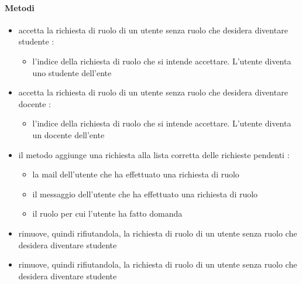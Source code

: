 \paragraph{Metodi}
\begin{itemize}
\item {}
\newline
accetta la richiesta di ruolo di un utente senza ruolo che desidera diventare studente
\newline
{} :
\begin{itemize}
\item {}
\newline
l'indice della richiesta di ruolo che si intende accettare. L'utente diventa uno studente dell'ente
\end{itemize}
\item {}
\newline
accetta la richiesta di ruolo di un utente senza ruolo che desidera diventare docente
\newline
{} :
\begin{itemize}
\item {}
\newline
l'indice della richiesta di ruolo che si intende accettare. L'utente diventa un docente dell'ente
\end{itemize}
\item {}
\newline
il metodo aggiunge una richiesta alla lista corretta delle richieste pendenti
\newline
{} :
\begin{itemize}
\item {}
\newline
la mail dell'utente che ha effettuato una richiesta di ruolo
\item {}
\newline
il messaggio dell'utente che ha effettuato una richiesta di ruolo
\item {}
\newline
il ruolo per cui l'utente ha fatto domanda
\end{itemize}
\item {}
\newline
rimuove, quindi rifiutandola, la richiesta di ruolo di un utente senza ruolo che desidera diventare studente
\newline
\item {}
\newline
rimuove, quindi rifiutandola, la richiesta di ruolo di un utente senza ruolo che desidera diventare studente
\newline
\end{itemize}
